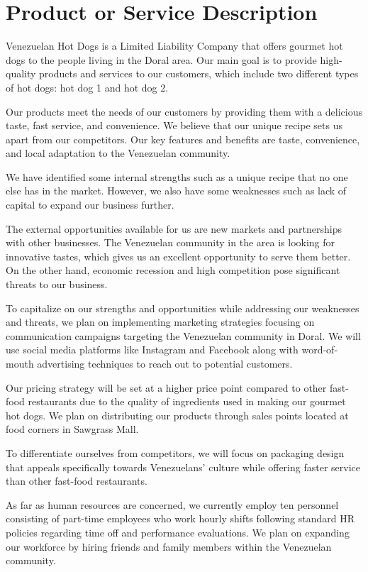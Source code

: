 \section{Product or Service Description}\label{sec:product}

Venezuelan Hot Dogs is a Limited Liability Company that offers gourmet hot dogs to the people living in the Doral area. Our main goal is to provide high-quality products and services to our customers, which include two different types of hot dogs: hot dog 1 and hot dog 2.

Our products meet the needs of our customers by providing them with a delicious taste, fast service, and convenience. We believe that our unique recipe sets us apart from our competitors. Our key features and benefits are taste, convenience, and local adaptation to the Venezuelan community.

We have identified some internal strengths such as a unique recipe that no one else has in the market. However, we also have some weaknesses such as lack of capital to expand our business further.

The external opportunities available for us are new markets and partnerships with other businesses. The Venezuelan community in the area is looking for innovative tastes, which gives us an excellent opportunity to serve them better. On the other hand, economic recession and high competition pose significant threats to our business.

To capitalize on our strengths and opportunities while addressing our weaknesses and threats, we plan on implementing marketing strategies focusing on communication campaigns targeting the Venezuelan community in Doral. We will use social media platforms like Instagram and Facebook along with word-of-mouth advertising techniques to reach out to potential customers.

Our pricing strategy will be set at a higher price point compared to other fast-food restaurants due to the quality of ingredients used in making our gourmet hot dogs. We plan on distributing our products through sales points located at food corners in Sawgrass Mall.

To differentiate ourselves from competitors, we will focus on packaging design that appeals specifically towards Venezuelans' culture while offering faster service than other fast-food restaurants.

As far as human resources are concerned, we currently employ ten personnel consisting of part-time employees who work hourly shifts following standard HR policies regarding time off and performance evaluations. We plan on expanding our workforce by hiring friends and family members within the Venezuelan community.

